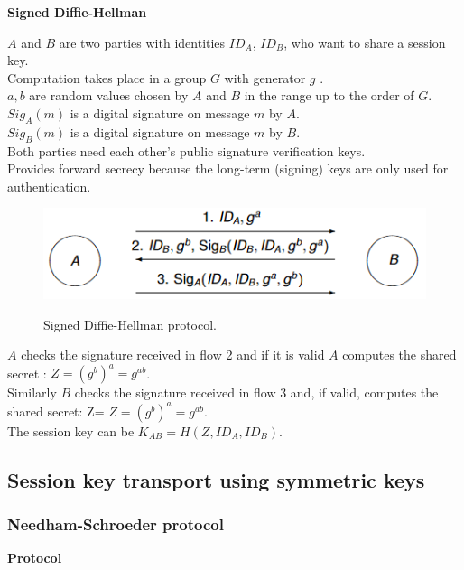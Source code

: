 \documentclass{article}
\begin{document}
\textbf{Signed Diffie-Hellman}

$A$ and $B$ are two parties with identities $ID_A$, $ID_B$, who want to share a session key.\\
Computation takes place in a group $G$ with generator $g$ .\\
$a, b$ are random values chosen by $A$ and $B$ in the range up to the order of $G$.\\
$Sig_A(m)$ is a digital signature on message $m$ by $A$.\\
$Sig_B(m)$ is a digital signature on message $m$ by $B$.\\
Both parties need each other’s public signature verification keys.\\
Provides forward secrecy because the long-term (signing) keys are only used for authentication.

\begin{figure}[H]
\centering
\includegraphics[scale=0.75]{Images/signeddiffiehellmanprotocol.png}
\label{fig:fround}
\caption{Signed Diffie-Hellman protocol.}
\end{figure}

$A$ checks the signature received in flow 2 and if it is valid $A$ computes the shared secret : $Z= (g^b)^a=g^{ab}$.\\
Similarly $B$ checks the signature received in flow 3 and, if valid, computes the shared secret: Z=  $Z= (g^b)^a=g^{ab}$.\\
The session key can be $K_{AB}=H(Z,ID_A,ID_B)$.

\subsection{Session key transport using symmetric keys}

\subsubsection{Needham-Schroeder protocol}

\textbf{Protocol}
\end{document}
